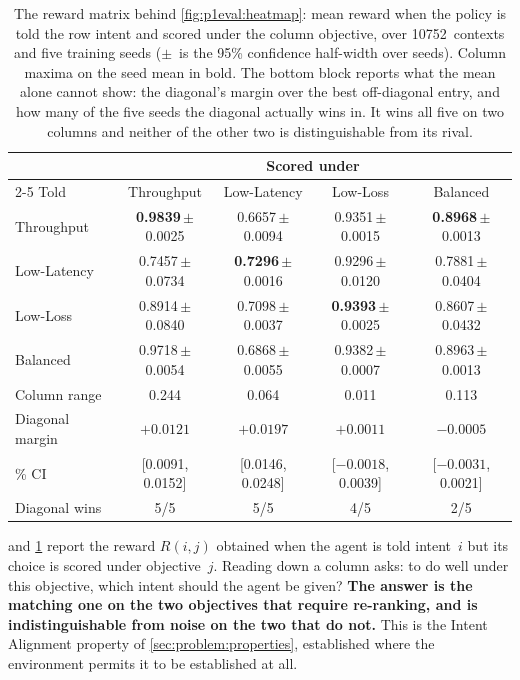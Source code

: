 \begin{table}[t]
  \centering
  \caption[The intent-alignment reward matrix]{The reward matrix behind \cref{fig:p1eval:heatmap}: mean reward when the policy is told the
  row intent and scored under the column objective, over 10752~contexts and five training seeds
  ($\pm$~is the 95\% confidence half-width over seeds). Column maxima on the seed mean in bold. The
  bottom block reports what the mean alone cannot show: the diagonal's margin over the best off-diagonal
  entry, and how many of the five seeds the diagonal actually wins in. It wins all five on two columns
  and neither of the other two is distinguishable from its rival.}
  \label{tab:p1eval:heatmap}
  \small
  \setlength{\tabcolsep}{4.5pt}
  \begin{tabular}{lcccc}
    \toprule
    & \multicolumn{4}{c}{Scored under} \\
    \cmidrule(lr){2-5}
    Told & Throughput & Low-Latency & Low-Loss & Balanced \\
    \midrule
    Throughput  & \textbf{0.9839}\,$\pm$0.0025 & 0.6657\,$\pm$0.0094 & 0.9351\,$\pm$0.0015
                & \textbf{0.8968}\,$\pm$0.0013 \\
    Low-Latency & 0.7457\,$\pm$0.0734 & \textbf{0.7296}\,$\pm$0.0016 & 0.9296\,$\pm$0.0120
                & 0.7881\,$\pm$0.0404 \\
    Low-Loss    & 0.8914\,$\pm$0.0840 & 0.7098\,$\pm$0.0037 & \textbf{0.9393}\,$\pm$0.0025
                & 0.8607\,$\pm$0.0432 \\
    Balanced    & 0.9718\,$\pm$0.0054 & 0.6868\,$\pm$0.0055 & 0.9382\,$\pm$0.0007
                & 0.8963\,$\pm$0.0013 \\
    \midrule
    Column range  & 0.244 & 0.064 & 0.011 & 0.113 \\
    Diagonal margin & $+0.0121$ & $+0.0197$ & $+0.0011$ & $-0.0005$ \\
    \quad 95\% CI & {\scriptsize [0.0091, 0.0152]} & {\scriptsize [0.0146, 0.0248]}
                  & {\scriptsize [$-0.0018$, 0.0039]} & {\scriptsize [$-0.0031$, 0.0021]} \\
    Diagonal wins & 5/5 & 5/5 & 4/5 & 2/5 \\
    \bottomrule
  \end{tabular}
\end{table}

 and \cref{tab:p1eval:heatmap} report the reward $R(i, j)$ obtained when the
agent is told intent~$i$ but its choice is scored under objective~$j$. Reading down a column asks: to do
well under this objective, which intent should the agent be given? \textbf{The answer is the matching one
on the two objectives that require re-ranking, and is indistinguishable from noise on the two that do
not.} This is the Intent Alignment property of \cref{sec:problem:properties}, established where the
environment permits it to be established at all.

